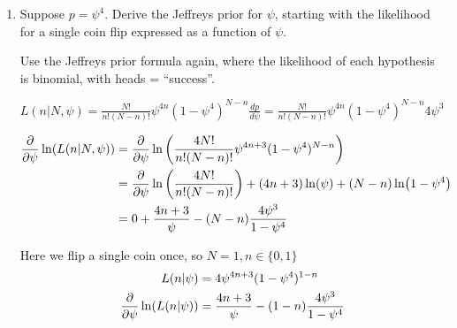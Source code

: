 \begin{enumerate}[label=\textbf{\Alph*}.]
    \item Suppose $p = \psi^4$. Derive the Jeffreys prior for $\psi$, starting with the likelihood for a single coin flip expressed as a function of $\psi$.
    
    Use the Jeffreys prior formula again, where the likelihood of each hypothesis is binomial, with heads = ``success''.

    $L(n|N, \psi) = \frac{N!}{n!(N-n)!} \psi^{4n} (1-\psi^4)^{N-n} \frac{dp}{d\psi} = \frac{N!}{n!(N-n)!} \psi^{4n} (1-\psi^4)^{N-n} 4\psi^3$

    \begin{align*}
        \frac{\partial}{\partial \psi} \ln(L(n|N, \psi)) &= \frac{\partial}{\partial \psi} \ln\left(\frac{4N!}{n!(N-n)!} \psi^{4n+3} (1-\psi^4)^{N-n}\right) \\
        &= \frac{\partial}{\partial \psi} \ln\left(\frac{4N!}{n!(N-n)!}\right) + (4n+3)\ln(\psi) + (N-n)\ln(1-\psi^4) \\
        &= 0 + \frac{4n+3}{\psi} - (N-n)\frac{4\psi^3}{1-\psi^4} \\
    \end{align*}

    Here we flip a single coin once, so $N=1, n \in \{0,1\}$
    \begin{align*}
        L(n|\psi) &= 4\psi^{4n+3} (1-\psi^4)^{1-n} \\
        \frac{\partial}{\partial \psi} \ln(L(n|\psi)) &= \frac{4n+3}{\psi} - (1-n)\frac{4\psi^3}{1-\psi^4} \\
    \end{align*}


\end{enumerate}
